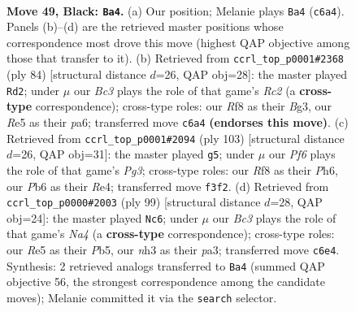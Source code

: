 \documentclass[11pt]{article}
\begin{document}
\clearpage

\begin{figure}[p]\centering
\begin{subfigure}{0.46\textwidth}\centering
\resizebox{\linewidth}{!}{%
\newchessgame
\chessboard[
  setfen={5r2/7k/1pb5/p1p1r3/8/2P2pPN/1K1N3P/7R b - - 5 49},
  showmover=false,
  pgfstyle=straightmove, color=movearrow, markmove={c6-a4}
]}
\caption{}
\end{subfigure}\hfill
\begin{subfigure}{0.46\textwidth}\centering
\resizebox{\linewidth}{!}{%
\newchessgame
\chessboard[
  setfen={6k1/7p/pr3pp1/8/8/3n1PBP/1PR3P1/6K1 w - - 7 43},
  showmover=false,
  pgfstyle=straightmove, color=movearrow, markmove={c2-d2}
]}
\caption{}
\end{subfigure}
\\[4pt]
\begin{subfigure}{0.46\textwidth}\centering
\resizebox{\linewidth}{!}{%
\newchessgame
\chessboard[
  setfen={1k3N2/8/3p2pp/3Pp3/4rp1b/7P/2R2PP1/5K2 b - - 3 52},
  showmover=false,
  pgfstyle=straightmove, color=movearrow, markmove={g6-g5}
]}
\caption{}
\end{subfigure}\hfill
\begin{subfigure}{0.46\textwidth}\centering
\resizebox{\linewidth}{!}{%
\newchessgame
\chessboard[
  setfen={8/4N1pk/7p/npr2p2/5P1P/P2RP3/8/5K2 b - - 0 50},
  showmover=false,
  pgfstyle=straightmove, color=movearrow, markmove={a5-c6}
]}
\caption{}
\end{subfigure}
\caption{\textbf{Move 49, Black: \texttt{Ba4}.} (a) Our position; Melanie plays \texttt{Ba4} (\texttt{c6a4}). Panels (b)--(d) are the retrieved master positions whose correspondence most drove this move (highest QAP objective among those that transfer to it). (b) Retrieved from \texttt{ccrl\_top\_p0001\#2368} (ply 84) [structural distance $d$=26, QAP obj=28]: the master played \texttt{Rd2}; under $\mu$ our \emph{Bc3} plays the role of that game's \emph{Rc2} (a \textbf{cross-type} correspondence); cross-type roles: our \emph{R}f8 as their \emph{B}g3, our \emph{R}e5 as their \emph{p}a6; transferred move \texttt{c6a4} \textbf{(endorses this move)}. (c) Retrieved from \texttt{ccrl\_top\_p0001\#2094} (ply 103) [structural distance $d$=26, QAP obj=31]: the master played \texttt{g5}; under $\mu$ our \emph{Pf6} plays the role of that game's \emph{Pg3}; cross-type roles: our \emph{R}f8 as their \emph{P}h6, our \emph{P}b6 as their \emph{R}e4; transferred move \texttt{f3f2}. (d) Retrieved from \texttt{ccrl\_top\_p0000\#2003} (ply 99) [structural distance $d$=28, QAP obj=24]: the master played \texttt{Nc6}; under $\mu$ our \emph{Bc3} plays the role of that game's \emph{Na4} (a \textbf{cross-type} correspondence); cross-type roles: our \emph{R}e5 as their \emph{P}b5, our \emph{n}h3 as their \emph{p}a3; transferred move \texttt{c6e4}. Synthesis: 2 retrieved analogs transferred to \texttt{Ba4} (summed QAP objective 56, the strongest correspondence among the candidate moves); Melanie committed it via the \texttt{search} selector.}
\label{fig:thought-m97}
\end{figure}
\end{document}
